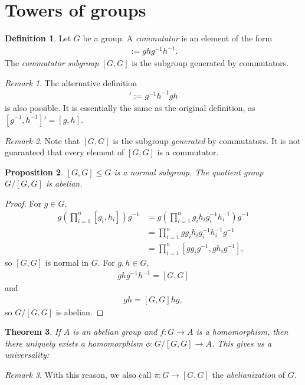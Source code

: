 \documentclass[12pt]{report}
\theoremstyle{plain}
\newtheorem{theorem}{Theorem}[section]
\newtheorem{proposition}[theorem]{Proposition}
\theoremstyle{remark}
\newtheorem*{remark}{Remark}
\theoremstyle{definition}
\newtheorem{definition}[theorem]{Definition}
\begin{document}
\section{Towers of groups}
\begin{definition}
    Let $G$ be a group. A \emph{commutator} is an element of the form
    \begin{align*}
        [g,h]:=ghg^{-1}h^{-1}.
    \end{align*}
    The \emph{commutator subgroup} $[G,G]$ is the subgroup generated by commutators.
\end{definition}
\begin{remark}
    The alternative definition
    \begin{align*}
        [g,h]':=g^{-1}h^{-1}gh
    \end{align*}
    is also possible. It is essentially the same as the original definition, as $[g^{-1},h^{-1}]'=[g,h]$.
\end{remark}
\begin{remark}
    Note that $[G,G]$ is the subgroup \emph{generated} by commutators. It is not guaranteed that every element of $[G,G]$ is a commutator.
\end{remark}

\begin{proposition}
    $[G,G]\le G$ is a normal subgroup. The quotient group $G/[G,G]$ is abelian.
\end{proposition}
\begin{proof}
    For $g\in G$,
    \begin{align*}
        g \left( \prod_{i=1}^n [g_i,h_i] \right)g^{-1} &= g \left( \prod_{i=1}^n g_{i}h_ig_i^{-1}h_i^{-1} \right)g^{-1} \\
        &= \prod_{i=1}^n gg_ih_ig_i^{-1}h_i^{-1}g^{-1} \\
        &= \prod_{i=1}^n [gg_ig^{-1},gh_ig^{-1}],
    \end{align*}
    so $[G,G]$ is normal in $G$. For $g,h\in G$,
    \begin{align*}
        [G,G]ghg^{-1}h^{-1} = [G,G]
    \end{align*}
    and
    \begin{align*}
        [G,G]gh = [G,G]hg,
    \end{align*}
    so $G/[G,G]$ is abelian.
\end{proof}

\begin{theorem}
    If $A$ is an abelian group and $f:G\rightarrow A$ is a homomorphism, then there uniquely exists a homomorphism $\phi:G/[G,G]\rightarrow A$. This gives us a universality:
    \begin{figure}[H]
    \centering
    \end{figure}
\end{theorem}
\begin{remark}
    With this reason, we also call $\pi:G\rightarrow [G,G]$ the \emph{abelianization} of $G$.
\end{remark}
\end{document}
